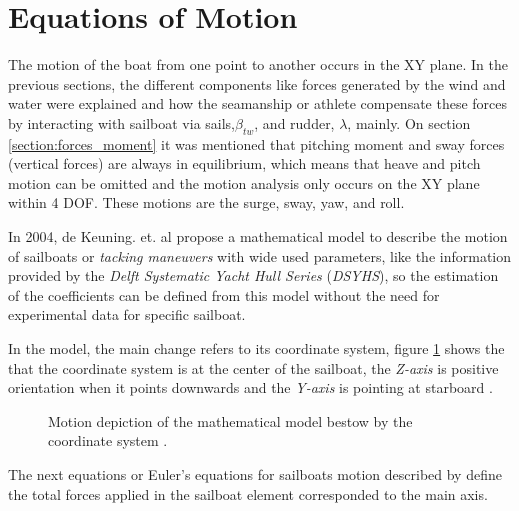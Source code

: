\section{Equations of Motion}
The motion of the boat from one point to another occurs in the XY plane. In the previous sections, the different components like forces generated by the wind and water were explained and how the seamanship or athlete compensate these forces by interacting with sailboat via sails,$\beta_{tw}$, and rudder, $\lambda$, mainly. On section \ref{section:forces_moment} 
it was mentioned that pitching moment and sway forces (vertical forces) are always in equilibrium, which means that heave and  pitch  motion can be omitted and the motion analysis only occurs on the XY plane within 4 DOF. These motions are the surge, sway, yaw, and roll.\par 

In 2004, de Keuning. et. al \cite{keuning2004mathematical} propose a mathematical model to describe the motion of sailboats or \textit{tacking maneuvers} with wide used parameters, like the information provided by the \textit{Delft Systematic Yacht Hull Series} (\textit{DSYHS}), so the estimation of the coefficients can be defined from this model without the need for experimental data for specific sailboat. \par 


In the model, the main change refers to its coordinate system, figure \ref{fig:csys_tackmodel} shows the that the coordinate system is at the center of the sailboat, the \textit{Z-axis} is positive orientation when it points downwards and the \textit{Y-axis} is pointing at starboard \cite{keuning2004mathematical}. \par

\begin{figure} %
  \centering
  \hfill
  \caption{Motion depiction of the mathematical model bestow by the coordinate system \cite{keuning2004mathematical}.}
\label{fig:csys_tackmodel} 
\end{figure}

The next equations or Euler's equations for sailboats motion described by \cite{keuning2004mathematical} define the total forces applied in the sailboat element corresponded to the main axis.\par

